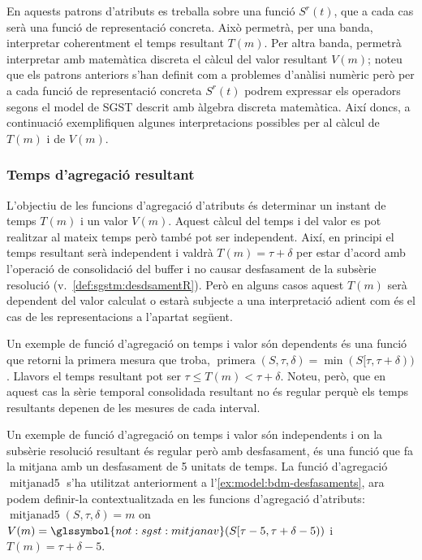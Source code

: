 En aquests patrons d'atributs es treballa sobre una funció $S^r(t)$,
que a cada cas serà una funció de representació concreta. Això
permetrà, per una banda, interpretar coherentment el temps resultant
$T(m)$. Per altra banda, permetrà interpretar amb matemàtica discreta
el càlcul del valor resultant $V(m)$; noteu que els patrons anteriors
s'han definit com a problemes d'anàlisi numèric però per a cada funció
de representació concreta $S^r(t)$ podrem expressar els operadors
segons el model de \gls{SGST} descrit amb àlgebra discreta matemàtica.
Així doncs, a continuació exemplifiquen algunes interpretacions
possibles per al càlcul de $T(m)$ i de $V(m)$.





\subsubsection{Temps d'agregació resultant}



L'objectiu de les funcions d'agregació d'atributs és determinar un
instant de temps $T(m)$ i un valor $V(m)$. Aquest càlcul del temps i
del valor es pot realitzar al mateix temps però també pot ser
independent. Així, en principi el temps resultant serà independent i
valdrà $T(m)=\tau+\delta$ per estar d'acord amb l'operació de
consolidació del buffer i no causar desfasament de la subsèrie
resolució (v.~\autoref{def:sgstm:desdsamentR}). Però en alguns casos
aquest $T(m)$ serà dependent del valor calculat o estarà subjecte a
una interpretació adient com és el cas de les representacions a
l'apartat següent.


Un exemple de funció d'agregació on temps i valor són dependents és
una funció que retorni la primera mesura que troba,
$\operatorname{primera}(S,\tau,\delta) = \min(S[\tau,\tau+\delta))$.
Llavors el temps resultant pot ser $\tau \leq T(m) <
\tau+\delta$. Noteu, però, que en aquest cas la sèrie temporal
consolidada resultant no és regular perquè els temps resultants
depenen de les mesures de cada interval.


Un exemple de funció d'agregació on temps i valor són independents i
on la subsèrie resolució resultant és regular però amb desfasament, és
una funció que fa la mitjana amb un desfasament de 5 unitats de temps.
La funció d'agregació $\operatorname{mitjanad5}$ s'ha utilitzat
anteriorment a l'\autoref{ex:model:bdm-desfasaments}, ara podem
definir-la contextualitzada en les funcions d'agregació d'atributs:
$\operatorname{mitjanad5}(S,\tau,\delta)=m$ on $V(m)=
\glssymbol{not:sgst:mitjanav}(S[\tau-5,\tau+\delta-5))$ i $T(m)=\tau+\delta-5$.

